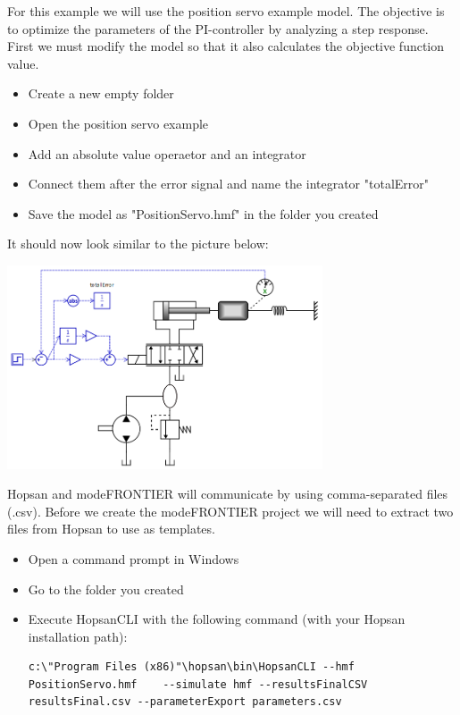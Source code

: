 \documentclass[a4paper]{article}
\begin{document}
\begin{tutenumerate}
For this example we will use the position servo example model. The objective is to optimize the parameters of the PI-controller by analyzing a step response. First we must modify the model so that it also calculates the objective function value.

\begin{itemize}
\item Create a new empty folder
\item Open the position servo example
\item Add an absolute value operaetor and an integrator
\item Connect them after the error signal and name the integrator "totalError"
\item Save the model as "PositionServo.hmf" in the folder you created
\end{itemize}

It should now look similar to the picture below:

\begin{center}
\includegraphics[width=0.7\textwidth]{gfx/modefrontier/hopsanmodel.png}\\
\end{center}

Hopsan and modeFRONTIER will communicate by using comma-separated files (.csv). Before we create the modeFRONTIER project we will need to extract two files from Hopsan to use as templates.
\begin{itemize}
\item Open a command prompt in Windows
\item Go to the folder you created
\item Execute HopsanCLI with the following command (with your Hopsan installation path):
\begin{lstlisting}[basicstyle=\ttfamily\footnotesize, breaklines=true]
c:\"Program Files (x86)"\hopsan\bin\HopsanCLI --hmf PositionServo.hmf    --simulate hmf --resultsFinalCSV resultsFinal.csv --parameterExport parameters.csv
\end{lstlisting}
\end{itemize}


\end{tutenumerate}
\end{document}
